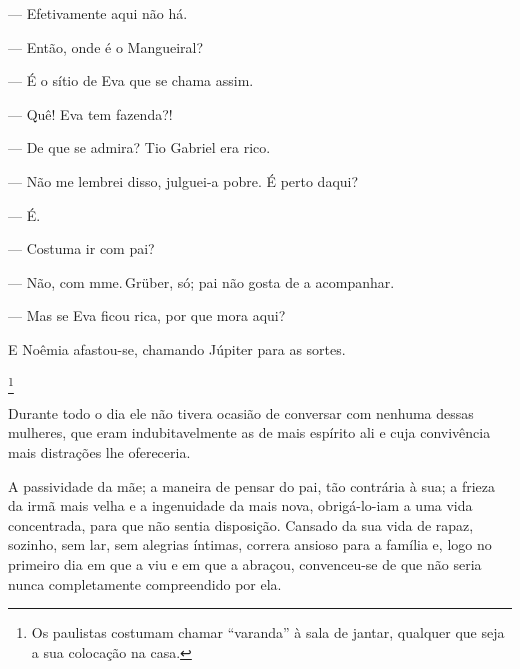 {

--- Efetivamente aqui não há.

--- Então, onde é o Mangueiral?

--- É o sítio de Eva que se chama assim.

--- Quê! Eva tem fazenda?!

--- De que se admira? Tio Gabriel era rico.

--- Não me lembrei disso, julguei-a pobre. É perto daqui?

--- É.

--- Costuma ir com pai?

--- Não, com mme.\,Grüber, só; pai não gosta de a acompanhar.

--- Mas se Eva ficou rica, por que mora aqui?


E Noêmia afastou-se, chamando Júpiter para as sortes.

\footnote{Os
  paulistas costumam chamar ``varanda'' à sala de jantar, qualquer que
  seja a sua colocação na casa.} 

Durante todo o dia ele não tivera ocasião de conversar com
nenhuma dessas mulheres, que eram indubitavelmente as de mais espírito
ali e cuja convivência mais distrações lhe ofereceria.

A passividade da mãe; a maneira de pensar do pai, tão contrária
à sua; a frieza da irmã mais velha e a ingenuidade da mais nova,
obrigá-lo-iam a uma vida concentrada, para que não sentia disposição.
Cansado da sua vida de rapaz, sozinho, sem lar, sem alegrias íntimas,
correra ansioso para a família e, logo no primeiro dia em que a viu e em
que a abraçou, convenceu-se de que não seria nunca completamente
compreendido por ela.

}
